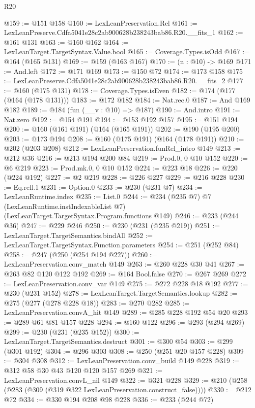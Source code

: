 \begin{lexlean}{R20}
\begin{coremodule}
@159 := @151 @158
@160 := LexLeanPreservation.Rel
@161 := LexLeanPreserve.Cdfa5041e28c2ab900628b238243bab86.R20.__fits_1
@162 := @161 @131
@163 := @160 @162
@164 := LexLeanTarget.TargetSyntax.Value.bool
@165 := Coverage.Types.isOdd
@167 := @164 (@165 @131)
@169 := @159 (@163 @167)
@170 := (n : @10) -> @169
@171 := And.left
@172 := @171 @169
@173 := @150 @72
@174 := @173 @158
@175 := LexLeanPreserve.Cdfa5041e28c2ab900628b238243bab86.R20.__fits_2
@177 := @160 (@175 @131)
@178 := Coverage.Types.isEven
@182 := @174 (@177 (@164 (@178 @131)))
@183 := @172 @182
@184 := Nat.rec.{0}
@187 := And @169 @182
@189 := @184 (fun (__v : @10) => @187)
@190 := And.intro
@191 := Nat.zero
@192 := @154 @191
@194 := @153 @192 @157
@195 := @151 @194
@200 := @160 (@161 @191) (@164 (@165 @191))
@202 := @190 (@195 @200)
@203 := @173 @194
@208 := @160 (@175 @191) (@164 (@178 @191))
@210 := @202 (@203 @208)
@212 := LexLeanPreservation.funRel_intro @149
@213 := @212 @36
@216 := @213 @194 @200 @84
@219 := Prod.{0, 0} @10 @152
@220 := @6 @219
@223 := Prod.mk.{0, 0} @10 @152
@224 := @223 @18
@226 := @220 (@224 @192)
@227 := @2 @219
@228 := @226 @227
@229 := @216 @228
@230 := Eq.refl.{1}
@231 := Option.{0}
@233 := @230 (@231 @7)
@234 := LexLeanRuntime.index
@235 := List.{0}
@244 := @234
    (@235 @7)
    @7
    (LexLeanRuntime.instIndexableList @7)
    (LexLeanTarget.TargetSyntax.Program.functions @149)
@246 := @233 (@244 @36)
@247 := @229 @246
@250 := @230 (@231 (@235 @219))
@251 := LexLeanTarget.TargetSemantics.bindAll
@252 := LexLeanTarget.TargetSyntax.Function.parameters
@254 := @251 (@252 @84)
@258 := @247 (@250 (@254 @194 @227))
@260 := LexLeanPreservation.conv_match @149
@263 := @260 @228 @30 @41
@267 := @263 @82 @120 @122 @192
@269 := @164 Bool.false
@270 := @267 @269
@272 := LexLeanPreservation.conv_var @149
@275 := @272 @228 @18 @192
@277 := @230 (@231 @152)
@278 := LexLeanTarget.TargetSemantics.lookup
@282 := @275 (@277 (@278 @228 @18))
@283 := @270 @282
@285 := LexLeanPreservation.convA_hit @149
@289 := @285 @228 @192 @54 @20
@293 := @289 @61 @81 @157 @228
@294 := @160 @122
@296 := @293 (@294 @269)
@299 := @230 (@231 (@235 @152))
@300 := LexLeanTarget.TargetSemantics.destruct
@301 := @300 @54
@303 := @299 (@301 @192)
@304 := @296 @303
@308 := @250 (@251 @20 @157 @228)
@309 := @304 @308
@312 := LexLeanPreservation.conv_build @149 @228
@319 := @312 @58 @30 @43 @120 @120 @157 @269
@321 := LexLeanPreservation.convL_nil @149
@322 := @321 @228
@329 := @210 (@258 (@283 (@309 (@319 @322 LexLeanPreservation.construct_false))))
@330 := @212 @72
@334 := @330 @194 @208 @98 @228
@336 := @233 (@244 @72)

\end{coremodule}
\end{lexlean}
